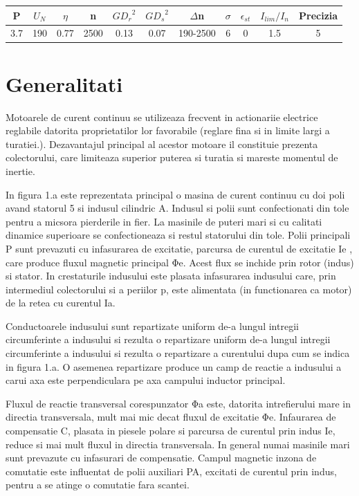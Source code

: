 \documentclass[11pt]{article}
\begin{document}
\begin{center}
\begin{tabular}{|c|c|c|c|c|c|c|c|c|c|c|}
	\hline
	P & $U_N$ & $\eta$ & n & ${GD_r}^2$ & ${GD_s}^2$ & $\Delta$n&$\sigma$&$\epsilon_{st}$ & $I_{lim}/I_n$&Precizia
	\\
	\hline
	3.7&190&0.77&2500&0.13&0.07&190-2500&6&0&1.5&5
	\\
	\hline
\end{tabular}
\end{center}

\newpage
\section{Generalitati}

Motoarele de curent continuu se utilizeaza frecvent in actionariie electrice reglabile datorita proprietatilor lor favorabile (reglare fina si in limite largi a turatiei.). Dezavantajul principal al acestor motoare il constituie prezenta colectorului, care limiteaza superior puterea si turatia si mareste momentul de inertie. 

In figura 1.a este reprezentata principal o masina de curent continuu cu doi poli avand statorul 5 si indusul cilindric A. Indusul si polii sunt confectionati din tole pentru a micsora pierderile in fier. La masinile de puteri mari si cu calitati dinamice superioare se confectioneaza si restul statorului din tole. Polii principali P sunt prevazuti cu infasurarea de excitatie, parcursa de curentul de excitatie Ie , care produce fluxul magnetic principal Φe. Acest flux se inchide prin rotor (indus) si stator. In crestaturile indusului este plasata infasurarea indusului care, prin intermediul colectorului si a periilor p, este alimentata (in functionarea ca motor) de la retea cu curentul Ia. 

Conductoarele indusului sunt repartizate uniform de-a lungul intregii circumferinte a indusului si rezulta o repartizare uniform de-a lungul intregii circumferinte a indusului si rezulta o repartizare a curentului dupa cum se indica in figura 1.a. O asemenea repartizare produce un camp de reactie a indusului a carui axa este perpendiculara pe axa campului inductor principal. 

Fluxul de reactie transversal corespunzator Φa este, datorita intrefierului mare in directia transversala, mult mai mic decat fluxul de excitatie Φe. Infaurarea de compensatie C, plasata in piesele polare si parcursa de curentul prin indus Ie, reduce si mai mult fluxul in directia transversala. In general numai masinile mari sunt prevazute cu infasurari de compensatie. 
Campul magnetic inzona de comutatie este influentat de polii auxiliari PA, excitati de curentul prin indus, pentru a se atinge o comutatie fara scantei.
\end{document}
